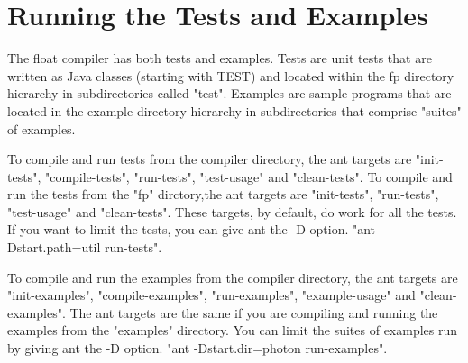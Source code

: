\section{Running the Tests and Examples}

The float compiler has both tests and examples.  Tests are unit tests that are written as Java classes (starting with TEST) and located within the fp directory hierarchy in subdirectories called "test".  Examples are sample programs that are located in the example directory hierarchy in subdirectories that comprise "suites" of examples.  

To compile and run tests from the compiler directory, the ant targets are "init-tests", "compile-tests", "run-tests", "test-usage" and "clean-tests".  To compile and run the tests from the "fp" dirctory,the ant targets are "init-tests", "run-tests", "test-usage" and "clean-tests".  These targets, by default, do work for all the tests.  If you want to limit the tests, you can give ant the -D option.  "ant -Dstart.path=util run-tests". 

To compile and run the examples from the compiler directory, the ant targets are "init-examples", "compile-examples", "run-examples", "example-usage" and "clean-examples".  The ant targets are the same if you are compiling and running the examples from the "examples" directory.  You can limit the suites of examples run by giving ant the -D option.  "ant -Dstart.dir=photon run-examples".



